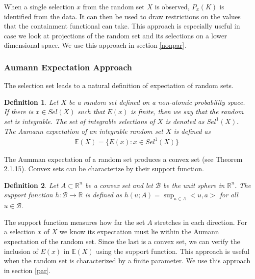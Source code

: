 \documentclass[reqno]{article}
\newtheorem{definition}{Definition}
\renewcommand{\cite}{\citet}
\begin{document}
When a single selection $x$ from the random set $X$ is observed, $P_x(K)$ is identified from the data. It can then be used to draw restrictions on the values that the containment functional can take. This approach is especially useful in case we look at projections of the random set and its selections on a lower dimensional space. We use this approach in section \ref{nonpar}.

\subsubsection{Aumann Expectation Approach}
 The selection set leads to a natural definition of expectation of random sets.

\begin{definition}
Let $X$ be a random set defined on a non-atomic probability space. If there is $x \in Sel(X)$ such that $E(x)$ is finite, then we say that the random set is integrable. The set of integrable selections of $X$ is denoted as $Sel^1(X)$. The Aumann expectation of an integrable random set $X$ is defined as 
\begin{align*}
    \mathbb{E}(X)=\{ E(x) : x \in Sel^1(X) \}\
\end{align*}
\end{definition}

The Aumman expectation of a random set produces a convex set (see \cite{Molchanov2005} Theorem 2.1.15). Convex sets can be characterize by their support function.

\begin{definition}
Let $A \subset \mathbb{R}^n$ be a convex set and let $\mathcal{B}$ be the unit sphere in $\mathbb{R}^n$. The support function $h: \mathcal{B} \rightarrow \mathbb{R}$ is defined as $h(u;A)=\sup_{a \in A} <u,a>$ for all $u \in \mathcal{B}$.
\end{definition}

The support function measures how far the set $A$ stretches in each direction. For a selection $x$ of $X$ we know its expectation must lie within the Aumann expectation of the random set. Since the last is a convex set, we can verify the inclusion of $E(x)$ in $\mathbb{E}(X)$ using the support function. This approach is useful when the random set is characterized by a finite parameter. We use this approach in section \ref{par}.

\end{document}
